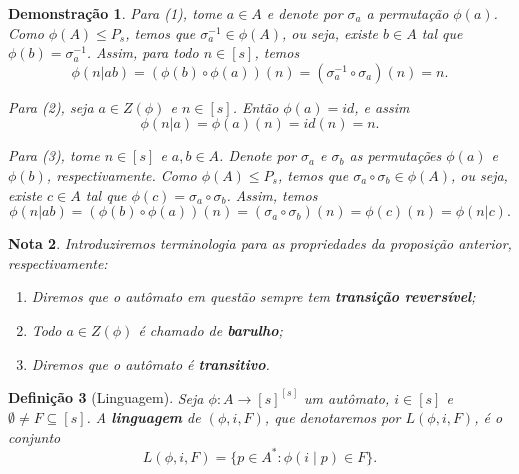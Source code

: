 \documentclass[11pt]{article}
\theoremstyle{plain}
\newtheorem{definicao}{Definição}[section]
\newtheorem{nota}[definicao]{Nota}
\theoremstyle{nonumberplain}
\newtheorem{demonstracao}[definicao]{Demonstração}
\newcommand{\set}[1]{\{#1\}}
\newcommand{\ainf}{A^*}
\newcommand{\funcset}[1]{#1^{#1}}
\newcommand{\automataAs}[1]{#1 : A \to \funcset{[s]}}
\begin{document}
\begin{demonstracao}
    Para (1), tome $a \in A$ e denote por $\sigma_a$ a permutação $\phi(a)$. Como $\phi(A) \leq P_s$, temos que $\sigma_a^{-1} \in \phi(A)$, ou seja, existe $b \in A$ tal que $\phi(b) = \sigma_a^{-1}$. Assim, para todo $n \in [s]$, temos \begin{equation}
        \phi(n | ab) = (\phi(b) \circ \phi(a))(n) = (\sigma_a^{-1} \circ \sigma_a)(n) = n.
    \end{equation}
    
    Para (2), seja $a \in Z(\phi)$ e $n \in [s]$. Então $\phi(a) = id$, e assim \begin{equation}
        \phi(n | a) = \phi(a)(n) = id(n) = n.
    \end{equation}
    
    Para (3), tome $n \in [s]$ e $a, b \in A$. Denote por $\sigma_a$ e $\sigma_b$ as permutações $\phi(a)$ e $\phi(b)$, respectivamente. Como $\phi(A) \leq P_s$, temos que $\sigma_a \circ \sigma_b \in \phi(A)$, ou seja, existe $c \in A$ tal que $\phi(c) = \sigma_a \circ \sigma_b$. Assim, temos \begin{equation}
        \phi(n | ab) = (\phi(b) \circ \phi(a))(n) = (\sigma_a \circ \sigma_b)(n) = \phi(c)(n) = \phi(n | c).
    \end{equation}
\end{demonstracao}

\begin{nota}
    Introduziremos terminologia para as propriedades da proposição anterior, respectivamente: \begin{enumerate}
        \item Diremos que o autômato em questão sempre tem \textbf{transição reversível};
        \item Todo $a \in Z(\phi)$ é chamado de \textbf{barulho}; 
        \item Diremos que o autômato é \textbf{transitivo}.
    \end{enumerate}
\end{nota}

\begin{definicao}[Linguagem] \label{def:linguagem}
    Seja $\automataAs{\phi}$ um autômato, $i \in [s]$ e $\emptyset \neq F \subseteq [s]$. A \textbf{linguagem} de $(\phi, i, F)$, que denotaremos por $L(\phi, i, F)$, é o conjunto \begin{equation}
        L(\phi, i, F) = \set{p \in \ainf : \phi(i \mid p) \in F}.
    \end{equation}
\end{definicao}
\end{document}
